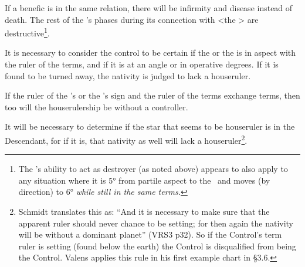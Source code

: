 If a benefic is in the same relation, there will be infirmity and disease instead of death. The rest of the \Moon’s phases during its connection with <the \Sun> are destructive\footnote{The \Moon's ability to act as destroyer (as noted above) appears to also apply to any situation where it is 5° from partile aspect to the \Sun\, and moves (by direction) to 6° \textsl{while still in the same terms.}}.

It is necessary to consider the control to be certain if the \Sun\xspace or the \Moon\xspace is in aspect with the ruler of the terms, and if it is at an angle or in operative degrees. If it is found to be turned away, the nativity is judged to lack a houseruler. 

If the ruler of the \Sun’s or the \Moon’s sign and the ruler of the terms exchange terms, then too will the houserulership be without a controller. 

It will be necessary to determine if the star that seems to be houseruler is in the Descendant, for if it is, that nativity as well will lack a houseruler\footnote{Schmidt translates this as: ``And it is necessary to make sure that the apparent ruler should never chance to be setting; for then again the nativity will be without a dominant planet'' (VRS3 p32). So if the Control's term ruler is setting (found below the earth) the Control is disqualified from being the Control. Valens applies this rule in his first example chart in \S{3.6}.}.

\newpage

